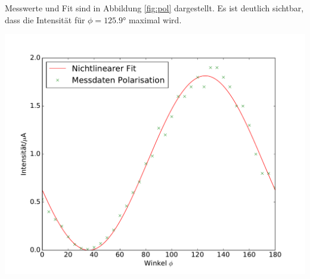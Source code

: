 \documentclass[captions=tableheading]{scrartcl}
\begin{document}
Messwerte und Fit sind in Abbildung \ref{fig:pol} dargestellt. Es ist deutlich sichtbar, dass die Intensität für $\phi=\ang{125.9}$ maximal wird.
\begin{center}
 	\includegraphics[width=\textwidth]{images/polarisation.pdf}
 	\label{fig:pol}
\end{center}
\end{document}
